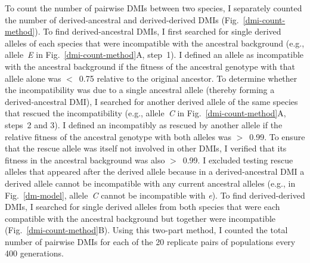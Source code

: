 \begin{doublespace}
To count the number of pairwise DMIs between two species,
I separately counted the number of derived-ancestral
and derived-derived DMIs (Fig.~\ref{dmi-count-method}).
%
To find derived-ancestral DMIs, I first searched
for single derived alleles of each species
that were incompatible with the ancestral background
(e.g., allele~\emph{E} in Fig.~\ref{dmi-count-method}A, step~1).
%
I defined an allele as incompatible with the ancestral background
if the fitness of the ancestral genotype with that allele alone
was $<$~0.75 relative to the original ancestor.
%
To determine whether the incompatibility was due to a single ancestral allele
(thereby forming a derived-ancestral DMI), I searched for another
derived allele of the same species that rescued the incompatibility
(e.g., allele~\emph{C} in Fig.~\ref{dmi-count-method}A, steps~2 and 3).
%
I defined an incompatibly as rescued by another allele if the relative fitness
of the ancestral genotype with both alleles was $>$~0.99.
%
To ensure that the rescue allele was itself not involved in other DMIs,
I verified that its fitness in the ancestral background was also $>$~0.99.
%
I excluded testing rescue alleles that appeared after the derived allele
because in a derived-ancestral DMI a derived allele cannot be incompatible
with any current ancestral alleles (e.g., in Fig.~\ref{dm-model},
allele~\emph{C} cannot be incompatible with \emph{e}).
%
To find derived-derived DMIs, I searched for single derived alleles
from both species that were each compatible with the ancestral background
but together were incompatible (Fig.~\ref{dmi-count-method}B).
%
Using this two-part method, I counted the total number of pairwise DMIs
for each of the 20 replicate pairs of populations every 400 generations.




\end{doublespace}
